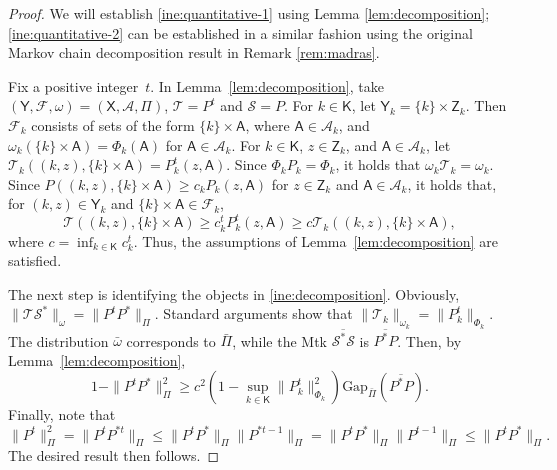 \documentclass[12pt]{article}
\newcommand{\X}{\mathsf{X}}
\newcommand{\Y}{\mathsf{Y}}
\newcommand{\Z}{\mathsf{Z}}
\newcommand{\SF}{\mathcal{A}}
\newcommand{\A}{\mathcal{A}}
\newcommand{\F}{\mathcal{F}}
\newcommand{\Mtk}{\mtkfont{T}}
\newcommand{\mtkfont}{\mathcal}
\begin{document}
\begin{proof}
	We will establish \eqref{ine:quantitative-1} using Lemma \ref{lem:decomposition}; \eqref{ine:quantitative-2} can be established in a similar fashion using the original Markov chain decomposition result in Remark \ref{rem:madras}.
	
	Fix a positive integer~$t$.
	In Lemma~\ref{lem:decomposition}, take $(\Y,\F,\omega) = (\X,\SF,\Pi)$, $\Mtk = P^t$ and $\mtkfont{S} = P$.
	For $k \in \mathsf{K}$, let $\Y_k = \{k\} \times \Z_k$.
	Then $\F_k$ consists of sets of the form $\{k\} \times \mathsf{A}$, where $\mathsf{A} \in \A_k$, and $\omega_k(\{k\} \times \mathsf{A}) = \Phi_k(\mathsf{A})$ for $\mathsf{A} \in \A_k$.
	For $k \in \mathsf{K}$, $z \in \Z_k$, and $\mathsf{A} \in \A_k$, let
	$
	\Mtk_k((k,z), \{k\} \times \mathsf{A}) = P_k^t(z, \mathsf{A}).
	$
	Since $\Phi_k P_k = \Phi_k$, it holds that $\omega_k \Mtk_k = \omega_k$.
	Since $P((k,z), \{k\} \times \mathsf{A}) \geq c_k P_k(z,\mathsf{A})$ for $z \in \Z_k$ and $\mathsf{A} \in \mathcal{A}_k$, it holds that, for $(k,z) \in \Y_k$ and $\{k\} \times \mathsf{A} \in \F_k$,
	\[
	\Mtk((k,z), \{k\} \times \mathsf{A}) \geq c_k^t P_k^t(z, \mathsf{A}) \geq c \Mtk_k((k,z), \{k\} \times \mathsf{A}),
	\]
	where $c = \inf_{k \in \mathsf{K}} c_k^t$.
	Thus, the assumptions of Lemma~\ref{lem:decomposition} are satisfied.
	
	The next step is identifying the objects in \eqref{ine:decomposition}.
	Obviously, $\|\Mtk \mtkfont{S}^*\|_{\omega} = \|P^t P^*\|_{\Pi}$.
	Standard arguments show that $\|\Mtk_k\|_{\omega_k} = \|P_k^t\|_{\Phi_k}$.
	The distribution $\bar{\omega}$ corresponds to $\bar{\Pi}$, while the Mtk $\overline{\mtkfont{S}^* \mtkfont{S}}$ is $\overline{P^*P}$.
	Then, by Lemma~\ref{lem:decomposition},
	\begin{equation} \nonumber
		1 - \|P^t P^*\|_{\Pi}^2 \geq c^2 \left( 1 - \sup_{k \in \mathsf{K}} \|P_k^t \|_{\Phi_k}^2 \right) \mbox{Gap}_{\bar{\Pi}}(\overline{P^*P}). 
	\end{equation}
	Finally, note that
	\[
	\|P^t\|_{\Pi}^2 = \|P^t P^{*t}\|_{\Pi} \leq \|P^t P^*\|_{\Pi} \|P^{* t-1}\|_{\Pi} = \|P^t P^*\|_{\Pi} \|P^{t-1}\|_{\Pi}  \leq \|P^t P^*\|_{\Pi}.
	\]
	The desired result then follows.
\end{proof}
\end{document}
